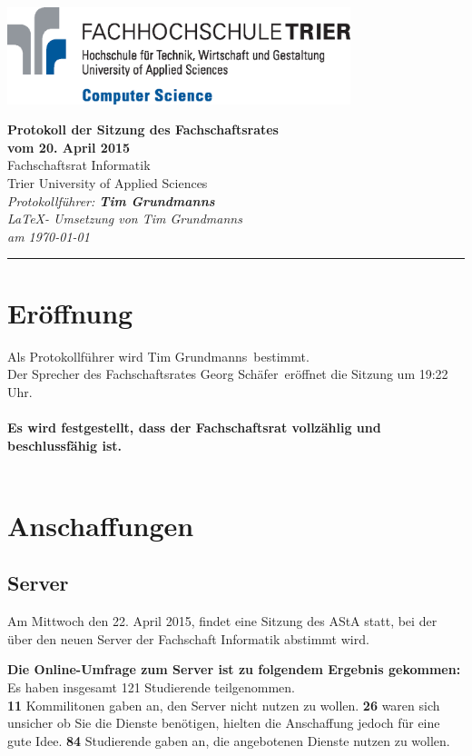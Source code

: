 \documentclass[a4paper, 11pt]{article} %
\newcommand{\protokoller}{Tim Grundmanns}
\newcommand{\dateOfMeeting}{20. April 2015}
\newcommand{\TeXer}{Tim  Grundmanns}
\newcommand{\fsiPresident}{Georg Schäfer}
\begin{document}

\doublespacing
\thispagestyle{empty}

\begin{center}
\includegraphics[width=10.0cm]{../logo_faculty_computer_science.eps}

\vspace*{\fill}
{\LARGE \textbf{Protokoll der Sitzung des Fachschaftsrates \\vom \dateOfMeeting}}\\
Fachschaftsrat Informatik\\
Trier University of Applied Sciences\\
\vspace{2.5cm}
\textit{
	Protokollführer: \textbf{\protokoller} \\
	\LaTeX - Umsetzung von \TeXer\\
	am \today
}
\vfill
\end{center}

\hspace*{-35cm}
\textcolor{fsi}{\rule{64.9cm}{15pt}}
\pagebreak
 
\setcounter{tocdepth}{2}
\tableofcontents 
\pagebreak

\section{Eröffnung}
Als Protokollführer wird \protokoller~bestimmt.\\
Der Sprecher des Fachschaftsrates \fsiPresident~eröffnet die Sitzung um 19:22 Uhr.
\\\\
\textbf{Es wird festgestellt, dass der Fachschaftsrat vollzählig und beschlussfähig ist.}
\\\\
\section{Anschaffungen}
\subsection{Server}
Am Mittwoch den 22. April 2015, findet eine Sitzung des AStA statt, bei der über den neuen Server der Fachschaft Informatik abstimmt wird.\\
\begin{flushleft}
\textbf{Die Online-Umfrage zum Server ist zu folgendem Ergebnis gekommen:}\\
Es haben insgesamt 121 Studierende teilgenommen.\\
\textbf{11} Kommilitonen gaben an, den Server nicht nutzen zu wollen. \textbf{26} waren sich unsicher ob Sie die Dienste benötigen, hielten die Anschaffung jedoch für eine gute Idee. \textbf{84} Studierende gaben an, die angebotenen Dienste nutzen zu wollen.
\end{flushleft}
\end{document}

